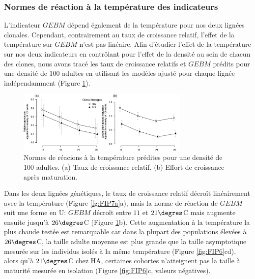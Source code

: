 \subsubsection{Normes de réaction à la température des indicateurs}

L'indicateur $GEBM$ dépend également de la température pour nos deux lignées
clonales. Cependant, contrairement au taux de croissance relatif, l'effet de la
température sur $GEBM$ n'est pas linéaire. Afin d'étudier l'effet de la
température sur nos deux indicateurs en contrôlant pour l'effet de la densité au
sein de chacun des clones, nous avons tracé les taux de croissance relatifs et
$GEBM$ prédits pour une densité de 100 adultes en utilisant les modèles ajusté
pour chaque lignée indépendamment (Figure \ref{fig:FIP7a}). 

\begin{figure}[!ht]
\begin{center}
\includegraphics[width=0.75\textwidth]{1_CorpsDeThese/Resumes/Fig/FIP07a}
\caption[Normes de réaction
prédites à la température]{Normes de réacions à la température prédites pour
une densité de 100 adultes. (a) Taux de croissance relatif. (b) Effort de
croissance après maturation.}
\label{fig:FIP7a}
\end{center}
\end{figure}

Dans les deux lignées génétiques, le taux de croissance relatif décroît
linéairement avec la température (Figure \ref{fg:FIP7a}a), mais la norme de
réaction de $GEBM$ suit une forme en U: $GEBM$ décroît entre $11$ et
$21\degres$C mais augmente ensuite jusqu'à $26\degres$C (Figure
\ref{fig:FIP7a}b). Cette augmentation à la température la plus chaude testée est
remarquable car dans la plupart des populations élevées à $26\degres$C, la
taille adulte moyenne est plus grande que la taille asymptotique mesurée sur les
individus isolés à la même température (Figure \ref{fig:FIP6}cd), alors qu'à
$21\degres$C chez HA, certaines cohortes n'atteignent pas la taille à maturité
mesurée en isolation (Figure \ref{fig:FIP6}c, valeurs négatives).

